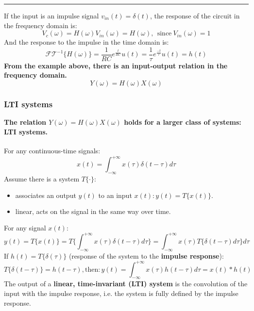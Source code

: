\begin{ex}{}
\vspace{0.5cm}
\hrule
\vspace{0.5cm}

If the input is an impulse signal $v_{in}(t) = \delta(t)$, the response of the circuit in the frequency domain is:
\[ 
V_{c}(\omega)  = H(\omega)V_{in}(\omega) = H(\omega), \ \ \text{since} \ V_{in}(\omega)=1
\]
And the response to the impulse in the time domain is:
\[ 
\mathcal{FT}^{-1}\{ H(\omega) \} = \frac{1}{RC} e^{\frac{t}{RC}} u(t) = \frac{1}{\tau} e^{\frac{-t}{\tau}} u(t) = h(t) 
\]
\textbf{From the example above, there is an input-output relation in the frequency domain.}
\[ 
Y(\omega) =  H(\omega)  X(\omega) 
\]
\end{ex}

\subsubsection{LTI systems}
\textbf{The relation $Y(\omega) =  H(\omega)  X(\omega)$ holds for a larger class of systems: LTI systems.}\\\\
For any continuous-time signals:
\[ x(t) = \int_{-\infty}^{+\infty} x(\tau) \delta(t-\tau)d\tau \]
Assume there is a system $T\{ \cdot \}$:
\begin{itemize}
\item associates an output $y(t)$ to an input $x(t):y(t) = T\{x(t)\}$.
\item linear, acts on the signal in the same way over time.
\end{itemize}
For any signal $x(t)$:
\[ y(t) = T\{x(t)\} = T \bigg\{ \int_{-\infty}^{+\infty} x(\tau)\delta(t-\tau) d\tau \bigg\} = \int_{-\infty}^{+\infty} x(\tau)T\bigg\{\delta(t-\tau) d\tau \bigg\} d\tau \]
If  $h(t) = T\{\delta(\tau)\} $ (response of the system to the \textbf{impulse response}):
\[ T\{\delta(t-\tau) \} = h(t-\tau), \text{then}: y(t) = \int_{-\infty}^{+\infty} x(\tau)h(t-\tau)d\tau = x(t)*h(t) \]
The output of a \textbf{linear, time-invariant (LTI) system} is the convolution of the input with the impulse response, i.e. the system is fully defined by the impulse response.

\vspace{0.5cm}
